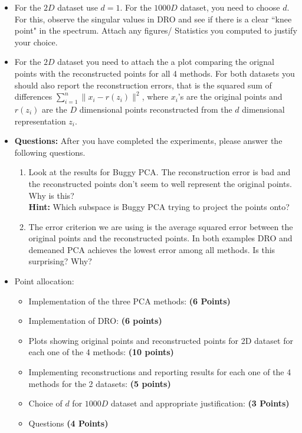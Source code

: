 \documentclass[letter]{article}
\theoremstyle{definition}
\begin{document}
\begin{itemize}
\item
For the $2D$ dataset use $d=1$. For the $1000D$ dataset, you need to choose
$d$. For this, observe the singular values in DRO and see if there is a clear
``knee point" in the spectrum.
Attach any figures/ Statistics you computed to justify your choice.

\item
For the $2D$ dataset you need to attach the a 
plot comparing the orignal points with the reconstructed points for all 4
methods.
For both datasets you should also report the reconstruction errors, that is the squared sum of
differences $\sum_{i=1}^n \|x_i - r(z_i)\|^2$,
where $x_i$'s are the original points and $r(z_i)$ are the $D$ dimensional points
reconstructed from the 
$d$ dimensional representation $z_i$.

\item \textbf{Questions:} After you have completed the experiments, please answer the following questions.
\begin{enumerate}
\item Look at the results for Buggy PCA. The reconstruction error is bad and the reconstructed points don't seem to well represent the original points. Why is
this? \\
\textbf{Hint: } Which subspace is Buggy PCA trying to project the points
onto?
\item The error criterion we are using is the average squared error 
between the original points and the reconstructed points.
In both examples DRO and demeaned PCA achieves the lowest error among all
methods. 
Is this surprising? Why?
\end{enumerate}

\item Point allocation:
\begin{itemize}
\item Implementation of the three PCA methods: \textbf{(6 Points)}
\item Implementation of DRO: \textbf{(6 points)}
\item Plots showing original points and reconstructed points for 2D dataset for each one of the 4 methods: \textbf{(10 points)}
\item Implementing reconstructions and reporting results for each one of the 4 methods for the 2 datasets: \textbf{(5 points)}
\item Choice of $d$ for $1000D$ dataset and appropriate justification:
\textbf{(3 Points)}
\item Questions \textbf{(4 Points)}
\end{itemize}

\end{itemize}
\end{document}
